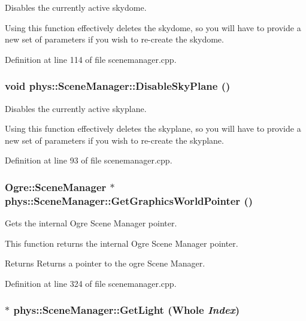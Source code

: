 Disables the currently active skydome. 

Using this function effectively deletes the skydome, so you will have to provide a new set of parameters if you wish to re-\/create the skydome. 

Definition at line 114 of file scenemanager.cpp.

\hypertarget{classphys_1_1SceneManager_af5763eedafdd11712b55ee33a11bd2b8}{
\subsubsection[{DisableSkyPlane}]{\setlength{\rightskip}{0pt plus 5cm}void phys::SceneManager::DisableSkyPlane ()}}
\label{dd/da8/classphys_1_1SceneManager_af5763eedafdd11712b55ee33a11bd2b8}


Disables the currently active skyplane. 

Using this function effectively deletes the skyplane, so you will have to provide a new set of parameters if you wish to re-\/create the skyplane. 

Definition at line 93 of file scenemanager.cpp.

\hypertarget{classphys_1_1SceneManager_af3e5081f780b6527f075d1bb579f0601}{
\subsubsection[{GetGraphicsWorldPointer}]{\setlength{\rightskip}{0pt plus 5cm}Ogre::SceneManager $\ast$ phys::SceneManager::GetGraphicsWorldPointer ()}}
\label{dd/da8/classphys_1_1SceneManager_af3e5081f780b6527f075d1bb579f0601}


Gets the internal Ogre Scene Manager pointer. 

This function returns the internal Ogre Scene Manager pointer. \begin{DoxyReturn}{Returns}
Returns a pointer to the ogre Scene Manager. 
\end{DoxyReturn}


Definition at line 324 of file scenemanager.cpp.

\hypertarget{classphys_1_1SceneManager_a1bdec8167e4cb2d958272a25148409ab}{
\subsubsection[{GetLight}]{ $\ast$ phys::SceneManager::GetLight ({\bf Whole} {\em Index})}}
\label{dd/da8/classphys_1_1SceneManager_a1bdec8167e4cb2d958272a25148409ab}


